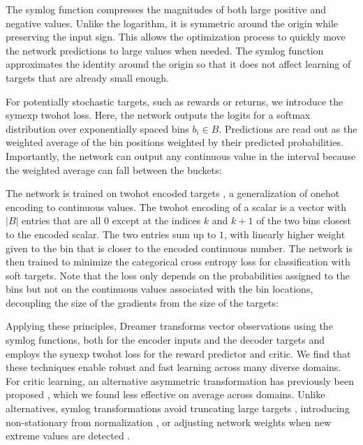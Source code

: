 
The symlog function compresses the magnitudes of both large positive and negative values.
Unlike the logarithm, it is symmetric around the origin while preserving the input sign.
This allows the optimization process to quickly move the network predictions to large values when needed.
The symlog function approximates the identity around the origin so that it does not affect learning of targets that are already small enough.

For potentially stochastic targets, such as rewards or returns, we introduce the symexp twohot loss. Here, the network outputs the logits for a softmax distribution over exponentially spaced bins $b_i \in B$.
Predictions are read out as the weighted average of the bin positions weighted by their predicted probabilities. Importantly, the network can output any continuous value in the interval because the weighted average can fall between the buckets:


The network is trained on twohot encoded targets \citep{schrittwieser2019muzero,bellemare2017c51}, a generalization of onehot encoding to continuous values. The twohot encoding of a scalar is a vector with $|B|$ entries that are all $0$ except at the indices $k$ and $k+1$ of the two bins closest to the encoded scalar. The two entries sum up to $1$, with linearly higher weight given to the bin that is closer to the encoded continuous number.
The network is then trained to minimize the categorical cross entropy loss for classification with soft targets. Note that the loss only depends on the probabilities assigned to the bins but not on the continuous values associated with the bin locations, decoupling the size of the gradients from the size of the targets:


Applying these principles, Dreamer transforms vector observations using the symlog functions, both for the encoder inputs and the decoder targets and employs the synexp twohot loss for the reward predictor and critic.
We find that these techniques enable robust and fast learning across many diverse domains.
For critic learning, an alternative asymmetric transformation has previously been proposed \citep{kapturowski2018r2d2}, which we found less effective on average across domains.
Unlike alternatives, symlog transformations avoid truncating large targets \citep{mnih2015dqn}, introducing non-stationary from normalization \citep{schulman2017ppo}, or adjusting network weights when new extreme values are detected \citep{hessel2019popart}.
